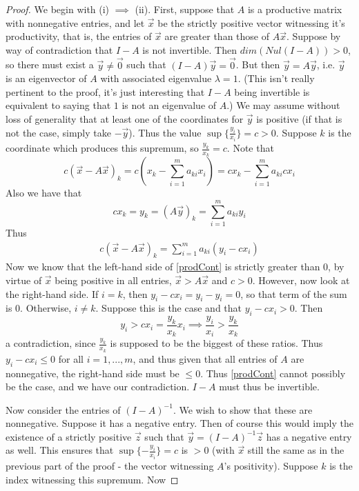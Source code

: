\documentclass{article}
\theoremstyle{definition}
\theoremstyle{plain}
\theoremstyle{theorem}
\begin{document}
\begin{proof}
	We begin with (i) $\implies$ (ii). First, suppose that $A$ is a productive matrix with nonnegative entries, and let $\vec{x}$ be the strictly positive vector witnessing it's productivity, that is, the entries of $\vec{x}$ are greater than those of $A\vec{x}$. Suppose by way of contradiction that $I-A$ is not invertible. Then $dim(Nul(I-A)) > 0$, so there must exist a $\vec{y} \neq \vec{0}$ such that $(I-A)\vec{y} = \vec{0}$. But then $\vec{y} = A\vec{y}$, i.e. $\vec{y}$ is an eigenvector of $A$ with associated eigenvalue $\lambda = 1$. (This isn't really pertinent to the proof, it's just interesting that $I-A$ being invertible is equivalent to saying that $1$ is not an eigenvalue of $A$.) We may assume without loss of generality that at least one of the coordinates for $\vec{y}$ is positive (if that is not the case, simply take $-\vec{y}$). Thus the value $\sup\{\frac{y_i}{x_i}\} = c > 0$. Suppose $k$ is the coordinate which produces this supremum, so $\frac{y_k}{x_k} = c$. Note that
	\[ c(\vec{x} - A\vec{x})_k = c(x_k-\sum_{i=1}^ma_{ki}x_i) = cx_k - \sum_{i=1}^ma_{ki}cx_i \]
Also we have that
	\[cx_k = y_k = (A\vec{y})_k = \sum_{i=1}^m a_{ki}y_i  \]
Thus 
\begin{align}
	c(\vec{x} - A\vec{x})_k = \sum_{i=1}^m a_{ki}(y_i - cx_i) \label{prodCont}
\end{align} 
Now we know that the left-hand side of \ref{prodCont} is strictly greater than $0$, by virtue of $\vec{x}$ being positive in all entries, $\vec{x} > A\vec{x}$ and $c > 0$. However, now look at the right-hand side. If $i=k$, then $y_i-cx_i = y_i-y_i = 0$, so that term of the sum is $0$. Otherwise, $i \neq k$. Suppose this is the case and that $y_i - cx_i > 0$. Then 
\[  y_i > cx_i = \frac{y_k}{x_k}x_i \implies \frac{y_i}{x_i} > \frac{y_k}{x_k} \]
a contradiction, since $\frac{y_k}{x_k}$ is supposed to be the biggest of these ratios. Thus $y_i - cx_i \leq 0$ for all $i = 1,...,m$, and thus given that all entries of $A$ are nonnegative, the right-hand side must be $\leq 0$. Thus \ref{prodCont} cannot possibly be the case, and we have our contradiction. $I-A$ must thus be invertible. \par 
Now consider the entries of $(I-A)^{-1}$. We wish to show that these are nonnegative. Suppose it has a negative entry. Then of course this would imply the existence of a strictly positive $\vec{z}$ such that $\vec{y}=(I-A)^{-1}\vec{z}$ has a negative entry as well. This ensures that $\sup\{-\frac{y_i}{x_i}\} = c$ is $> 0$ (with $\vec{x}$ still the same as in the previous part of the proof - the vector witnessing $A$'s positivity). Suppose $k$ is the index witnessing this supremum. Now 

\end{proof}
\end{document}
